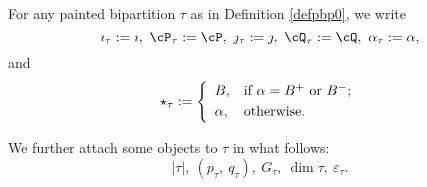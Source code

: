 \documentclass[12pt,a4paper]{amsart}
\def\abs#1{\left|{#1}\right|}
\newcommand{\CO}{{\mathcal {O}}}
\newcommand{\CP}{{\mathcal {P}}}
\newcommand{\CQ}{{\mathcal {Q}}}
\numberwithin{equation}{section}
\theoremstyle{remark}
\newtheorem*{remark}{Remark}
\begin{document}

For any painted bipartition $\tau$ as in Definition \ref{defpbp0}, we write
\[
  \imath_\tau:=\imath,\ \cP_\tau:=\cP,\  \jmath_\tau:=\jmath,\  \cQ_\tau:=\cQ,\ \alpha_\tau:=\alpha,
\]
and
\[
  \star_\tau:= \left\{
     \begin{array}{ll}
         B, &\hbox{if $\alpha=B^+$ or $B^-$}; \smallskip\\
            \alpha, & \hbox{otherwise}.           \end{array}
   \right.
  \]

We further attach some objects to $\tau$ in what follows:
 \[
  \abs{\tau}, \    (p_\tau, \ q_\tau), \ G_\tau, \ \dim \tau, \ \varepsilon_\tau .
 \]



\smallskip

\end{document}
